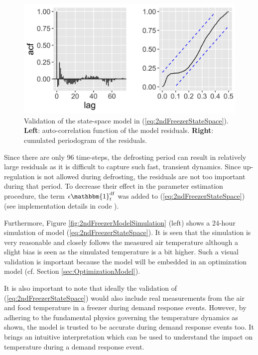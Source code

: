 \begin{figure}[!t]
    \centering
    \includegraphics[width=\columnwidth]{../figures/2ndFreezerModelValidation.png}
    \caption{ Validation of the state-space model in (\ref{eq:2ndFreezerStateSpace}). \textbf{Left}: auto-correlation function of the model residuals. \textbf{Right}: cumulated periodogram of the residuals.}
    \label{fig:2ndFreezerModelValidation}
\end{figure}

Since there are only 96 time-steps, the defrosting period can result in relatively large residuals as it is difficult to capture such fast, transient dynamics. Since up-regulation is not allowed during defrosting, the residuals are not too important during that period. To decrease their effect in the parameter estimation procedure, the term $ \epsilon \mathbbm{1}^{\text{df}}_{t}$ was added to (\ref{eq:2ndFreezerStateSpace}) (see implementation details in code \cite{}).

Furthermore, Figure \ref{fig:2ndFreezerModelSimulation} (left) shows a 24-hour simulation of model (\ref{eq:2ndFreezerStateSpace}). It is seen that the simulation is very reasonable and closely follows the measured air temperature although a slight bias is seen as the simulated temperature is a bit higher. Such a visual validation is important because the model will be embedded in an optimization model (cf. Section \ref{sec:OptimizationModel}).

It is also important to note that ideally the validation of (\ref{eq:2ndFreezerStateSpace}) would also include real measurements from the air and food temperature in a freezer during demand response events. However, by adhering to the fundamental physics governing the temperature dynamics as shown, the model is trusted to be accurate during demand response events too. It brings an intuitive interpretation which can be used to understand the impact on temperature during a demand response event.

